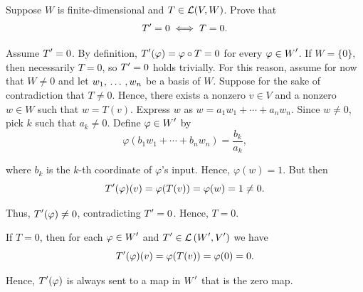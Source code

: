 \begin{xrcs}
  Suppose $W$ is finite-dimensional and $T \in \mathcal{L} (V,W)$. Prove that
  \begin{equation}
    \displaystyle T' = 0 \iff T = 0.
  \end{equation}
  \begin{xprf}
    \Rightarrowdirection Assume $\displaystyle T' = 0$. By definition, $\displaystyle T'(\varphi) = \varphi \circ T = 0$ for every $\varphi \in \displaystyle W'$. If $W = \{0\}$, then necessarily $T = 0$, so $\displaystyle T' = 0$ holds trivially.
    For this reason, assume for now that $W \neq 0$ and let $w_1, {\, \ldots \,\,}, w_n$ be a basis of $W$. Suppose for the sake of contradiction that $T \neq 0$. Hence, there exists a nonzero $v \in V$ and a nonzero $w \in W$ such that $w=T(v)$. Express $w$ as $w=a_1 w_1 + \cdots + a_n w_n$. Since $w \neq 0$, pick $k$ such that $a_k \neq 0$. Define $\varphi \in \displaystyle W'$ by
    \begin{equation}
      \varphi(b_1 w_1 + \cdots + b_n w_n) = \frac{b_k}{a_k},
    \end{equation}

    where $b_k$ is the $k$-th coordinate of $\varphi$'s input. Hence, $\varphi(w) =1$.
    But then
    \begin{equation}
      \displaystyle T'(\varphi) (v) = \varphi(T(v)) = \varphi(w) = 1 \neq 0.
    \end{equation}

    Thus, $\displaystyle T'(\varphi) \neq 0$, contradicting $\displaystyle T' = 0$. Hence, $T = 0$.

    \Leftarrowdirection If $T = 0$, then for each $\varphi \in \displaystyle W'$ and $\displaystyle T' \in {\mathcal{L}\left (\displaystyle W', \displaystyle V'\right )}$ we have
    \begin{equation}
      \displaystyle T' (\varphi) (v) = \varphi(T(v)) = \varphi(0) = 0.
    \end{equation}

    Hence, $\displaystyle T' (\varphi)$ is always sent to a map in $\displaystyle W'$ that is the zero map.
  \end{xprf}
\end{xrcs}


